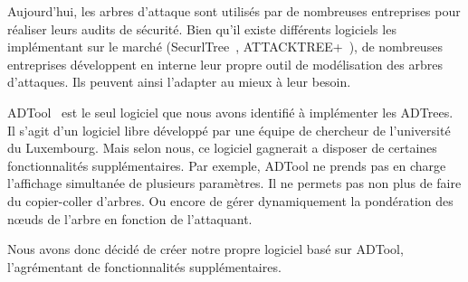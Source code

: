     
        Aujourd'hui, les arbres d'attaque sont utilisés par de nombreuses entreprises pour réaliser leurs audits de sécurité. Bien qu'il existe différents logiciels les implémentant sur le marché (SecurlTree~\cite{SecurlTree}, ATTACKTREE+~\cite{ATTACKTREE+}), de nombreuses entreprises développent en interne leur propre outil de modélisation des arbres d'attaques. Ils peuvent ainsi l'adapter au mieux à leur besoin. 

        ADTool~\cite{ADTool} est le seul logiciel que nous avons identifié à implémenter les ADTrees. Il s'agit d'un logiciel libre développé par une équipe de chercheur de l'université du Luxembourg. Mais selon nous, ce logiciel gagnerait a disposer de certaines fonctionnalités supplémentaires. Par exemple, ADTool ne prends pas en charge l'affichage simultanée de plusieurs paramètres. Il ne permets pas non plus de faire du copier-coller d'arbres. Ou encore de gérer dynamiquement la pondération des nœuds de l’arbre en fonction de l'attaquant. 

        Nous avons donc décidé de créer notre propre logiciel basé sur ADTool, l'agrémentant de fonctionnalités supplémentaires.




